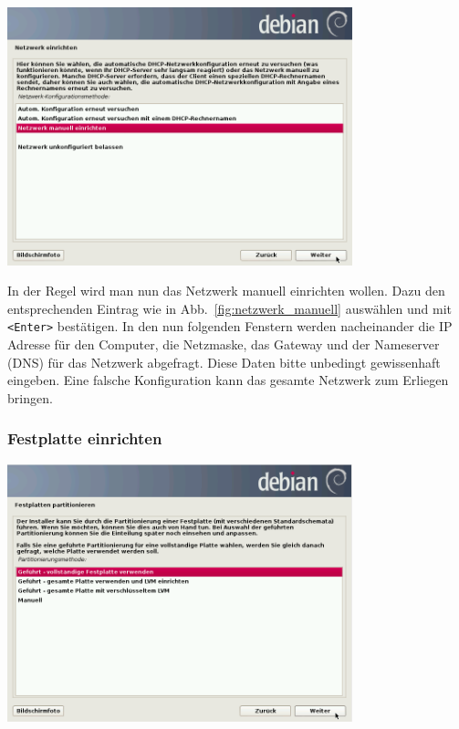 \documentclass[a4paper,12pt,twoside]{article}
\begin{document}
\begin{minipage}{\textwidth}
    \centering
    \includegraphics[width=10cm]{efaLivede-img/efaLivede-img8.png}
    \label{fig:netzwerk_manuell}
\end{minipage}
\bigskip

In der Regel wird man nun das Netzwerk manuell einrichten wollen. Dazu
den entsprechenden Eintrag wie in Abb.~\ref{fig:netzwerk_manuell} auswählen und
mit \texttt{{\textless}Enter{\textgreater}} bestätigen. In den nun folgenden
Fenstern werden nacheinander die IP Adresse für den Computer, die
Netzmaske, das Gateway und der Nameserver (DNS) für das Netzwerk
abgefragt. Diese Daten bitte unbedingt gewissenhaft eingeben. Eine
falsche Konfiguration kann das gesamte Netzwerk zum Erliegen bringen.


\subsubsection{Festplatte einrichten}
\label{sct:inst_festplatte}

\begin{minipage}{\linewidth}
    \centering
    \includegraphics[width=10cm]{efaLivede-img/efaLivede-img9.png}
    \label{fig:partitionierung}
\end{minipage}
\bigskip
\end{document}
